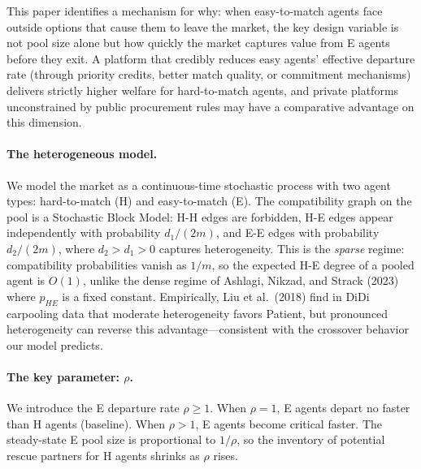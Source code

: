 \documentclass{article}
\theoremstyle{plain}
\theoremstyle{definition}
\begin{document}
This paper identifies a mechanism for why: when easy-to-match agents face outside options that cause
them to leave the market, the key design variable is not pool size alone but
how quickly the market captures value from E agents before they exit.  A
platform that credibly reduces easy agents' effective departure rate (through
priority credits, better match quality, or commitment mechanisms) delivers
strictly higher welfare for hard-to-match agents, and private platforms
unconstrained by public procurement rules may have a comparative advantage
on this dimension.

\paragraph{The heterogeneous model.}
We model the market as a continuous-time stochastic process with two agent
types: hard-to-match (H) and easy-to-match (E).  The compatibility graph on
the pool is a Stochastic Block Model: H-H edges are forbidden, H-E edges
appear independently with probability $d_1/(2m)$, and E-E edges with
probability $d_2/(2m)$, where $d_2>d_1>0$ captures heterogeneity.  This is
the \emph{sparse} regime: compatibility probabilities vanish as $1/m$, so
the expected H-E degree of a pooled agent is $O(1)$, unlike the dense regime
of Ashlagi, Nikzad, and Strack (2023) where $p_{HE}$ is a fixed constant.
Empirically, Liu et al.\ (2018) find in DiDi carpooling data that moderate
heterogeneity favors Patient, but pronounced heterogeneity can reverse this
advantage---consistent with the crossover behavior our model predicts.

\paragraph{The key parameter: $\rho$.}
We introduce the E departure rate $\rho\ge 1$.  When $\rho=1$, E agents
depart no faster than H agents (baseline).  When $\rho>1$, E agents become
critical faster.  The steady-state E pool size is proportional to $1/\rho$,
so the inventory of potential rescue partners for H agents shrinks as $\rho$
rises.
\end{document}
